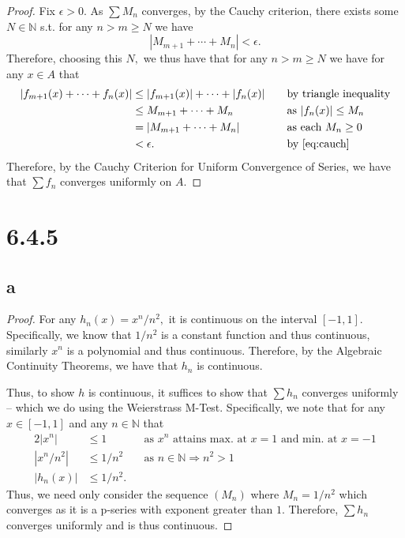 \documentclass[10pt]{article}
\begin{document}
\begin{proof}
    Fix $\epsilon > 0.$ As $\sum M_n$ converges, by the Cauchy criterion, there exists some $N\in\mathbb{N}$ s.t. for any $n>m\ge N$ we have
    \begin{equation}\label{eq:cauch}
        |M_{m+1}+\cdots+M_n|<\epsilon.
    \end{equation}
    Therefore, choosing this $N,$ we thus have that for any $n>m\ge N$ we have for any $x\in A$ that
    \begin{align*}
        |f_{m+1}(x)+\cdots + f_n(x)| &\le |f_{m+1}(x)|+\cdots+|f_n(x)|\quad&&\text{by triangle inequality}\\
        &\le M_{m+1}+\cdots+M_n &&\text{as }|f_n(x)|\le M_n\\
        &= |M_{m+1}+\cdots+M_n| &&\text{as each }M_n\ge 0\\
        &<\epsilon. &&\text{by \eqref{eq:cauch}}
    \end{align*}
    Therefore, by the Cauchy Criterion for Uniform Convergence of Series, we have that $\sum f_n$ converges uniformly on $A$.
\end{proof}

\section*{6.4.5}

\subsection*{a}

\begin{proof}
    For any $h_n(x)=x^n/n^2,$ it is continuous on the interval $[-1,1].$ Specifically, we know that $1/n^2$ is a constant function and thus continuous, similarly $x^n$ is a polynomial and thus continuous. Therefore, by the Algebraic Continuity Theorems, we have that $h_n$ is continuous.

    Thus, to show $h$ is continuous, it suffices to show that $\sum h_n$ converges uniformly -- which we do using the Weierstrass M-Test. Specifically, we note that for any $x\in [-1,1]$ and any $n\in\mathbb{N}$ that
    \begin{alignat*}{2}
        |x^n| &\le 1 \quad&&\text{as $x^n$ attains max. at $x=1$ and min. at $x=-1$}\\
        |x^n/n^2| &\le 1/n^2 &&\text{as $n\in\mathbb{N}\Rightarrow n^2>1$}\\
        |h_n(x)| &\le 1/n^2.
    \end{alignat*}
    Thus, we need only consider the sequence $(M_n)$ where $M_n = 1/n^2$ which converges as it is a p-series with exponent greater than $1$. Therefore,  $\sum h_n$ converges uniformly and is thus continuous.
\end{proof}
\end{document}
